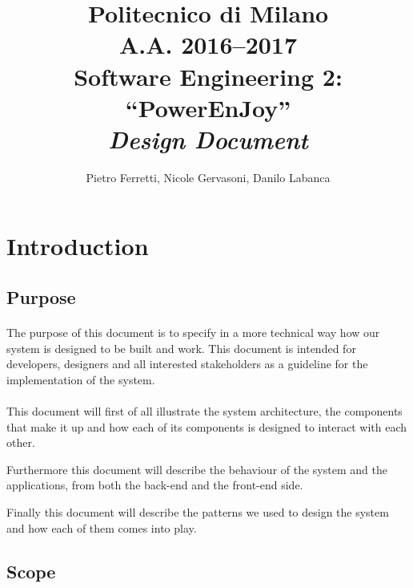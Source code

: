 \documentclass[english]{article}
\begin{document}
\title{Politecnico di Milano\\
 A.A. 2016–2017 \\
Software Engineering 2: “PowerEnJoy” \\
\emph{Design Document}}

\author{Pietro Ferretti, Nicole Gervasoni, Danilo Labanca}
\maketitle

\newpage

\tableofcontents{}

\newpage

\section{Introduction}

\subsection{Purpose}

\paragraph{}
The purpose of this document is to specify in a more technical way how our system is designed to be built and work. 
This document is intended for developers, designers and all interested stakeholders as a guideline for the implementation of the system.

\paragraph{}
This document will first of all illustrate the system architecture, the components that make it up and how each of its components is designed to interact with each other.

Furthermore this document will describe the behaviour of the system and the applications, from both the back-end and the front-end side.

Finally this document will describe the patterns we used to design the system and how each of them comes into play.



\subsection{Scope}
\end{document}
